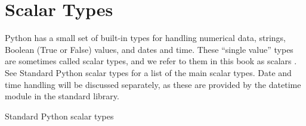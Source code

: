 \documentclass[
  letterpaper,
  DIV=11,
  numbers=noendperiod]{scrreprt}
\begin{document}
\hypertarget{scalar-types}{%
\section{Scalar Types}\label{scalar-types}}

Python has a small set of built-in types for handling numerical data,
strings, Boolean (True or False) values, and dates and time. These
``single value'' types are sometimes called scalar types, and we refer
to them in this book as scalars . See Standard Python scalar types for a
list of the main scalar types. Date and time handling will be discussed
separately, as these are provided by the datetime module in the standard
library.

\begin{table}

\caption{\textbf{?(caption)}}\begin{minipage}[t]{\linewidth}

{\centering 

}

\end{minipage}%
\newline
\begin{minipage}[t]{\linewidth}

{\centering 

}

\end{minipage}%
\newline
\begin{minipage}[t]{\linewidth}

{\centering 

Standard Python scalar types

}

\end{minipage}%
\newline
\begin{minipage}[t]{\linewidth}

{\centering 

}

\end{minipage}%
\newline
\begin{minipage}[t]{\linewidth}

{\centering 

}

\end{minipage}%
\newline
\begin{minipage}[t]{\linewidth}


\end{minipage}
\end{table}
\end{document}
